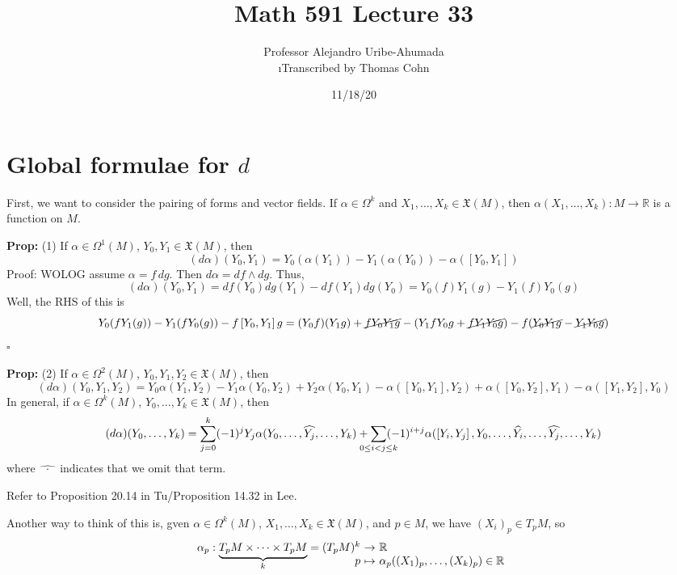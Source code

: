 \documentclass[10pt,letterpaper]{article}
\author{Professor Alejandro Uribe-Ahumada\\ \small\i{Transcribed by Thomas Cohn}}
\title{Math 591 Lecture 33}
\date{11/18/20} %
\newcommand{\n}{\hfill\break}
\newcommand{\hangblock}[2]{\par\noindent\settowidth{\hangindent}{\textbf{#1: }}\textbf{#1: }\nolinebreak#2}
\newcommand{\prop}[1]{\hangblock{Prop}{#1}}
\newcommand{\proven}{\;$\square$\n}
\newcommand{\reals}{\mathbb{R}}
\newcommand{\R}{\reals}
\newcommand{\map}[4]{\!\!\!\begin{array}[t]{rcl}#1 & \!\!\!\!\to & \!\!\!\!#2\\ {}#3 & \!\!\!\!\mapsto & \!\!\!\!#4\end{array}}
\renewcommand{\brack}[1]{\left[#1\right]}
\begin{document}
\maketitle
\setlength\RaggedRightParindent{\parindent}
\RaggedRight

\section*{Global formulae for $d$}

\par\noindent
First, we want to consider the pairing of forms and vector fields. If $\alpha\in\Omega^{k}$ and $X_{1},\ldots,X_{k}\in\mathfrak{X}(M)$, then $\alpha(X_{1},\ldots,X_{k}):M\to\R$ is a function on $M$.\n

\prop{
	(1) If $\alpha\in\Omega^{1}(M)$, $Y_{0},Y_{1}\in\mathfrak{X}(M)$, then
	\[
		(d\alpha)(Y_{0},Y_{1})=Y_{0}(\alpha(Y_{1}))-Y_{1}(\alpha(Y_{0}))-\alpha(\brack{Y_{0},Y_{1}})
	\]
	Proof: WOLOG assume $\alpha=f\,dg$. Then $d\alpha=df\wedge{}dg$. Thus,
	\[
		(d\alpha)(Y_{0},Y_{1})=df(Y_{0})dg(Y_{1})-df(Y_{1})dg(Y_{0})=Y_{0}(f)Y_{1}(g)-Y_{1}(f)Y_{0}(g)
	\]
	Well, the RHS of this is
	\[
		Y_{0}(fY_{1}(g))-Y_{1}(fY_{0}(g))-f\brack{Y_{0},Y_{1}}g=(Y_{0}f)(Y_{1}g)+\cancel{fY_{0}Y_{1}g}-(Y_{1}fY_{0}g+\cancel{fY_{1}Y_{0}g})-f(\cancel{Y_{0}Y_{1}g}-\cancel{Y_{1}Y_{0}g})
	\]
	\proven
}

\prop{
	(2) If $\alpha\in\Omega^{2}(M)$, $Y_{0},Y_{1},Y_{2}\in\mathfrak{X}(M)$, then
	\[
		(d\alpha)(Y_{0},Y_{1},Y_{2})=Y_{0}\alpha(Y_{1},Y_{2})-Y_{1}\alpha(Y_{0},Y_{2})+Y_{2}\alpha(Y_{0},Y_{1})-\alpha(\brack{Y_{0},Y_{1}},Y_{2})+\alpha(\brack{Y_{0},Y_{2}},Y_{1})-\alpha(\brack{Y_{1},Y_{2}},Y_{0})
	\]
	In general, if $\alpha\in\Omega^{k}(M)$, $Y_{0},\ldots,Y_{k}\in\mathfrak{X}(M)$, then
	\[
		(d\alpha)(Y_{0},\ldots,Y_{k})=\sum_{j=0}^{k}(-1)^{j}Y_{j}\alpha(Y_{0},\ldots,\widehat{Y_{j}},\ldots,Y_{k})+\smashoperator{\sum_{0\le{}i<j\le{}k}}(-1)^{i+j}\alpha(\brack{Y_{i},Y_{j}},Y_{0},\ldots,\widehat{Y_{i}},\ldots,\widehat{Y_{j}},\ldots,Y_{k})
	\]
	where $\widehat{\;\,\cdot\;\,}$ indicates that we omit that term.\n
}

\par\noindent
Refer to Proposition 20.14 in Tu/Proposition 14.32 in Lee.\n

\par\noindent
Another way to think of this is, gven $\alpha\in\Omega^{k}(M)$, $X_{1},\ldots,X_{k}\in\mathfrak{X}(M)$, and $p\in{}M$, we have $(X_{i})_{p}\in{}T_{p}M$, so
\[
	\map{\alpha_{p}:\smash{\underbrace{T_{p}M\times\cdots\times{}T_{p}M}_{k}}=(T_{p}M)^{k}}{\R}{p}{\alpha_{p}((X_{1})_{p},\ldots,(X_{k})_{p})\in\R}
\]
\end{document}
